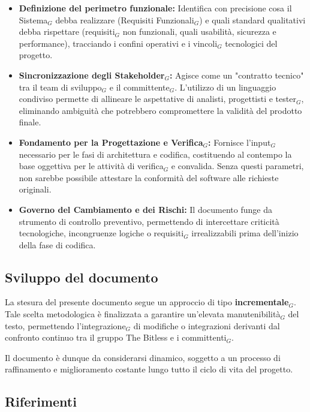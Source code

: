 \documentclass[a4paper, 10pt]{article}
\begin{document}
\begin{itemize}
    \item \textbf{Definizione del perimetro funzionale:} Identifica con precisione cosa il Sistema$_G$ debba realizzare (Requisiti Funzionali$_G$) e quali standard qualitativi debba rispettare (requisiti$_G$ non funzionali, quali usabilità, sicurezza e performance), tracciando i confini operativi e i vincoli$_G$ tecnologici del progetto.
    
    \item \textbf{Sincronizzazione degli Stakeholder$_G$:} Agisce come un "contratto tecnico" tra il team di sviluppo$_G$ e il committente$_G$. L'utilizzo di un linguaggio condiviso permette di allineare le aspettative di analisti, progettisti e tester$_G$, eliminando ambiguità che potrebbero compromettere la validità del prodotto finale.
    
    \item \textbf{Fondamento per la Progettazione e Verifica$_G$:} Fornisce l'input$_G$ necessario per le fasi di architettura e codifica, costituendo al contempo la base oggettiva per le attività di verifica$_G$ e convalida. Senza questi parametri, non sarebbe possibile attestare la conformità del software alle richieste originali.
    
    \item \textbf{Governo del Cambiamento e dei Rischi:} Il documento funge da strumento di controllo preventivo, permettendo di intercettare criticità tecnologiche, incongruenze logiche o requisiti$_G$ irrealizzabili prima dell'inizio della fase di codifica.
\end{itemize}

\subsection{Sviluppo del documento}
La stesura del presente documento segue un approccio di tipo \textbf{incrementale$_G$}. Tale scelta metodologica è finalizzata a garantire un'elevata manutenibilità$_G$ del testo, permettendo l'integrazione$_G$ di modifiche o integrazioni derivanti dal confronto continuo tra il gruppo The Bitless e i committenti$_G$. 

Il documento è dunque da considerarsi dinamico, soggetto a un processo di raffinamento e miglioramento costante lungo tutto il ciclo di vita del progetto.

\subsection{Riferimenti}
\end{document}
